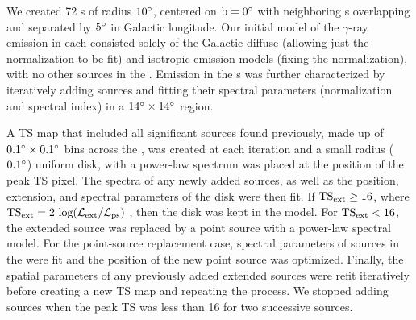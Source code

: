 We created 72 \roi{}s of radius ${\rm 10^{\circ}}$, centered on ${\rm b = 0^{\circ}}$ with neighboring \roi{}s overlapping and separated by ${\rm 5^{\circ}}$ in Galactic longitude.  Our initial model of the $\gamma$-ray emission in each \roi{} consisted solely of the Galactic diffuse (allowing just the normalization to be fit) and isotropic emission models (fixing the normalization), with no other sources in the \roi{}. Emission in the \roi{}s was further characterized by iteratively adding sources and fitting their spectral parameters (normalization and spectral index) in a ${\rm 14^{\circ}}\times{\rm 14^{\circ}}$ region. 

A TS map that included all significant sources found previously, made up of ${\rm 0.1^{\circ}}\times{\rm 0.1^{\circ}}$ bins across the \roi{}, was created at each iteration and a small radius (${\rm 0.1^{\circ}}$) uniform disk, with a power-law spectrum was placed at the position of the peak TS pixel. The spectra of any newly added sources, as well as the position, extension, and spectral parameters of the disk were then fit. If $\rm TS_{ext} \geq 16$, where  ${\rm TS_{ext} = 2~log(\mathcal{L}_{ext} / \mathcal{L}_{ps})}$ \citep[\ie{} twice the log-likelihood ratio of an extended to a point source,][]{Lande12}, then the disk was kept in the model. For $\rm TS_{ext} < 16$, the extended source was replaced by a point source with a power-law spectral model. For the point-source replacement case, spectral parameters of sources in the \roi{} were fit and the position of the new point source was optimized. Finally, the spatial parameters of any previously added extended sources were refit iteratively before creating a new TS map and repeating the process. We stopped adding sources when the peak TS was less than 16 for two successive sources. 

